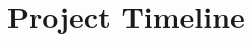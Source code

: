 \documentclass[../mthe-493-project-proposal.tex]{subfiles}
\begin{document}
    \chapter{Project Timeline}
    \label{ch:project-timeline}
\end{document}
